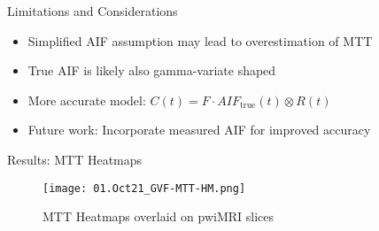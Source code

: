 \begin{frame}{Limitations and Considerations}
\begin{itemize}
    \item Simplified AIF assumption may lead to overestimation of MTT
    \item True AIF is likely also gamma-variate shaped
    \item More accurate model: $C(t) = F \cdot AIF_{\text{true}}(t) \otimes R(t)$
    \item Future work: Incorporate measured AIF for improved accuracy
\end{itemize}
\end{frame}

\begin{frame}{Results: MTT Heatmaps}
\begin{figure}
    \texttt{[image: 01.Oct21\_GVF-MTT-HM.png]}
    \caption{MTT Heatmaps overlaid on pwiMRI slices}
\end{figure}
\end{frame}